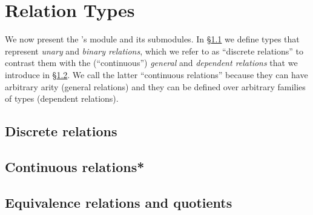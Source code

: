 \section{Relation Types}\label{sec:relat-quot-types}
We now present the \agdaualib's  module and its submodules. In \S\ref{sec:discrete-relations} we define types that represent \emph{unary} and \emph{binary relations}, which we refer to as ``discrete relations'' to contrast them with the (``continuous'') \emph{general} and \emph{dependent relations} that we introduce in \S\ref{sec:continuous-relations}. We call the latter ``continuous relations'' because they can have arbitrary arity (general relations) and they can be defined over arbitrary families of types (dependent relations).

\subsection{Discrete relations}\label{sec:discrete-relations}


\subsection{Continuous relations*\protect\footnotemark}\label{sec:continuous-relations}


\subsection{Equivalence relations and quotients}\label{sec:equiv-relat-quot}


